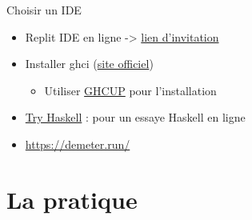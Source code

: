 \documentclass[presentation]{beamer}
\begin{document}
\begin{frame}[label={sec:org10b4ca0}]{Choisir un IDE}
\begin{block}{}
{}

\end{block}
\begin{block}{}
\begin{itemize}
\item <1->Replit IDE en ligne ->  \href{https://replit.com/join/ybqsuyuphr-maliky}{lien d'invitation}
\item <2->Installer ghci (\href{https://www.haskell.org/downloads/}{site officiel})
\begin{itemize}
\item Utiliser \href{https://www.haskell.org/ghcup/}{GHCUP} pour l'installation
\end{itemize}
\item <3-> \href{https://tryhaskell.org/\#step3}{Try Haskell}  : pour un essaye Haskell en ligne
\item <4-> \url{https://demeter.run/}
\end{itemize}
\end{block}
\end{frame}
\section{La pratique}
\label{sec:orgcbf5ace}
\end{document}

